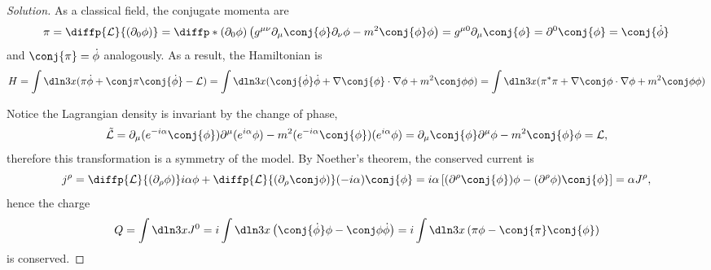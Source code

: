 \begin{proof}[Solution]
   As a classical field, the conjugate momenta are
   \begin{equation*}
      \pi = \diffp{\mathcal{L}}{(\partial_0\phi)} = \diffp*{}{(\partial_0\phi)}\left(g^{\mu \nu} \partial_\mu \conj{\phi} \partial_\nu \phi - m^2 \conj{\phi}\phi\right) = g^{\mu0} \partial_\mu\conj{\phi} = \partial^0 \conj{\phi} = \conj{\dot\phi}
   \end{equation*}
   and \(\conj{\pi} = \dot\phi\) analogously. As a result, the Hamiltonian is
   \begin{equation*}
      H = \int\dln3x (\pi \dot{\phi} + \conj\pi \conj{\dot\phi} - \mathcal{L}) = \int \dln3x (\conj{\dot{\phi}} \dot\phi + \nabla \conj{\phi} \cdot \nabla \phi + m^2 \conj\phi \phi) = \int \dln3x ( \pi^* \pi + \nabla \conj\phi \cdot \nabla \phi + m^2 \conj\phi \phi)
   \end{equation*}

   Notice the Lagrangian density is invariant by the change of phase,
   \begin{equation*}
      \tilde{\mathcal{L}} =  \partial_\mu (e^{-i \alpha} \conj{\phi}) \partial^\mu (e^{i \alpha}\phi) - m^2 (e^{-i \alpha} \conj{\phi})(e^{i \alpha} \phi) = \partial_\mu \conj{\phi} \partial^\mu \phi - m^2 \conj{\phi}\phi = \mathcal{L},
   \end{equation*}
   therefore this transformation is a symmetry of the model. By Noether's theorem, the conserved current is
   \begin{equation*}
      j^\rho = \diffp{\mathcal{L}}{(\partial_\rho \phi)} i \alpha \phi + \diffp{\mathcal{L}}{(\partial_\rho \conj\phi)} (-i \alpha) \conj{\phi} = i \alpha  \left[(\partial^\rho\conj{\phi})\phi - (\partial^\rho \phi)\conj{\phi} \right] = \alpha J^\rho,
   \end{equation*}
   hence the charge
   \begin{equation*}
      Q = \int \dln3x J^0 = i\int \dln3x \left(\conj{\dot\phi} \phi - \conj\phi\dot\phi\right) = i\int \dln3x \left(\pi \phi - \conj{\pi} \conj{\phi}\right)
   \end{equation*}
   is conserved.


\end{proof}

